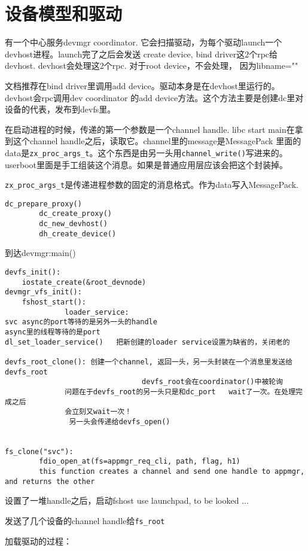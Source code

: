 \section{设备模型和驱动}
有一个中心服务devmgr coordinator. 它会扫描驱动，为每个驱动launch一个devhost进程。launch完了之后会发送
create device, bind driver这2个rpc给devhost. devhost会处理这2个rpc. 对于root device，不会处理，
因为libname=""

文档推荐在bind driver里调用add device。驱动本身是在devhost里运行的。devhost会rpc调用dev coordinator
的add device方法。这个方法主要是创建dc里对设备的代表，发布到devfs里。


在启动进程的时候，传递的第一个参数是一个channel handle.
libc start main在拿到这个channel handle之后，读取它。channel里的message是MessagePack
里面的data是\verb|zx_proc_args_t|。这个东西是由另一头用\verb|channel_write()|写进来的。
userboot里面是手工组装这个消息。如果是普通应用层应该会把这个封装掉。

\verb|zx_proc_args_t|是传递进程参数的固定的消息格式。作为data写入MessagePack.

\begin{verbatim}
dc_prepare_proxy()
        dc_create_proxy()
        dc_new_devhost()
        dh_create_device()
\end{verbatim}


到达devmgr:main()
\begin{verbatim}
devfs_init():
    iostate_create(&root_devnode)
devmgr_vfs_init():
    fshost_start():
              loader_service:
svc async的port等待的是另外一头的handle
async里的线程等待的是port
dl_set_loader_service()   把新创建的loader service设置为缺省的，关闭老的

devfs_root_clone(): 创建一个channel, 返回一头，另一头封装在一个消息里发送给devfs_root
                                devfs_root会在coordinator()中被轮询
              问题在于devfs_root的另一头只是和dc_port   wait了一次。在处理完成之后
              会立刻又wait一次！
               另一头会传递给devfs_open()


fs_clone("svc"): 
        fdio_open_at(fs=appmgr_req_cli, path, flag, h1)
        this function creates a channel and send one handle to appmgr, and returns the other 
\end{verbatim}

设置了一堆handle之后，启动fshost      
use launchpad, to be looked ...
    
发送了几个设备的channel handle给\verb|fs_root|



加载驱动的过程：

